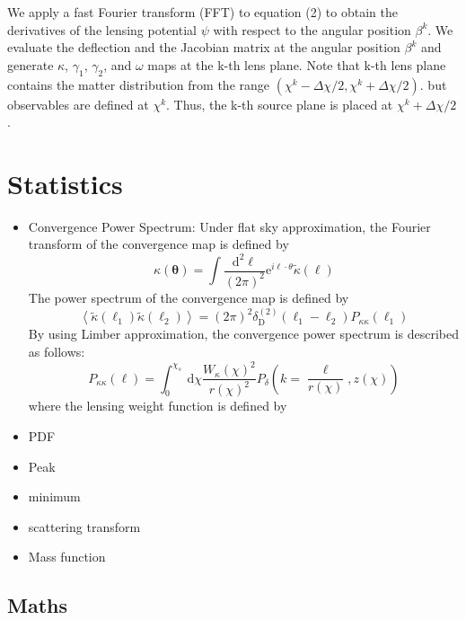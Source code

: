 \documentclass[fleqn,usenatbib]{mnras}
\begin{document}
We apply a fast Fourier transform (FFT) to equation (2) to obtain the derivatives of the lensing potential $\psi$ with respect to the angular position $\beta^k$.
We evaluate the deflection and the Jacobian matrix at the angular position $\beta^k$ and generate $\kappa$, $\gamma_1$, $\gamma_2$, and $\omega$ maps at the k-th lens plane.
Note that k-th lens plane contains the matter distribution from the range $\left( \chi^k - \Delta \chi/2, \chi^k + \Delta \chi/2 \right)$.
but observables are defined at $\chi^k$. Thus, the k-th source plane is placed at $\chi^k + \Delta \chi/2$.

\section{Statistics}
\begin{itemize}
    \item Convergence Power Spectrum: 
    Under flat sky approximation, the Fourier transform of the convergence map is defined by 
    \begin{equation}
        \kappa(\boldsymbol{\theta})=\int \frac{\mathrm{d}^2 \ell}{(2 \pi)^2} \mathrm{e}^{i \ell \cdot \theta} \tilde{\kappa}(\boldsymbol{\ell})
    \end{equation}
    The power spectrum of the convergence map is defined by
    \begin{equation}
        \left\langle\tilde{\kappa}\left(\boldsymbol{\ell}_1\right) \tilde{\kappa}\left(\boldsymbol{\ell}_2\right)\right\rangle=(2 \pi)^2 \delta_{\mathrm{D}}^{(2)}\left(\boldsymbol{\ell}_1-\boldsymbol{\ell}_2\right) P_{\kappa \kappa}\left(\ell_1\right)
    \end{equation}
    By using Limber approximation, the convergence power spectrum is described as follows:
    \begin{equation}
        P_{\kappa \kappa}(\ell)=\int_0^{\chi_s} \mathrm{~d} \chi \frac{W_\kappa(\chi)^2}{r(\chi)^2} P_\delta\left(k=\frac{\ell}{r(\chi)}, z(\chi)\right)
    \end{equation}
    where the lensing weight function is defined by
    
    \item PDF
    \item Peak
    \item minimum
    \item scattering transform
    \item Mass function
\end{itemize}

\subsection{Maths}
\end{document}
